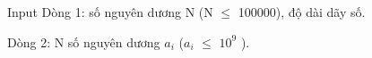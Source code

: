 Input
Dòng 1: số nguyên dương N (N  $\le$  100000), độ dài dãy số.

Dòng 2: N số nguyên dương $a_{i}$ ($a_{i}$  $\le$  $10^{9}$ ).